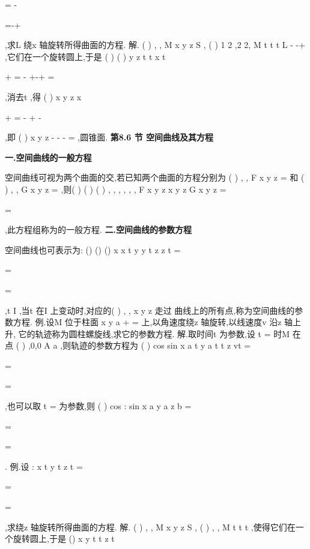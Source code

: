 =
-

=-+

,求L 绕x 轴旋转所得曲面的方程. 
解.
(
)
, ,
M x y z
S
\forall 
\in 
,
(
)
1 2 ,2
2,
M
t
t
t
L
\exists 
-
-+
\in 
,它们在一个旋转圆上,于是 
(
)
(
)
y
z
t
t
x
t

+
=
-
+-+
=

,消去t ,得
(
)
x
y
z
x


+
=
-
+
-




,即 
(
)
x
y
z
-
-
-
=
,圆锥面. 
\vspace{6pt}
{\large \bfseries \textcolor{lyred}{第8.6 节 空间曲线及其方程}}

\vspace{4pt}
{\bfseries \textcolor{lyred}{一.空间曲线的一般方程}}

空间曲线\Gamma 可视为两个曲面的交,若已知两个曲面的方程分别为
(
)
, ,
F x y z =
和 
(
)
, ,
G x y z =
,则(
)
(
)
(
)
, ,
, ,
, ,
F x y z
x y z
G x y z
=

\in \Gamma \Leftrightarrow 
=

,此方程组称为\Gamma 的\textcolor{lyred}{一般方程}. 
\vspace{4pt}
{\bfseries \textcolor{lyred}{二.空间曲线的参数方程}}

空间曲线也可表示为\Gamma :
()
()
()
x
x t
y
y t
z
z t
=


=


=

,t
I
\in 
,当t 在I 上变动时,对应的(
)
, ,
x y z 走过 
曲线上的所有点,称为空间曲线的\textcolor{lyred}{参数方程}. 
\textcolor{lyred}{例}.设M 位于柱面
x
y
a
+
=
上,以角速度\omega 绕z 轴旋转,以线速度v 沿z 轴上升, 
它的轨迹称为\textcolor{lyred}{圆柱螺旋线},求它的参数方程. 
解.取时间t 为参数,设
t =
时M 在点
(
)
,0,0
A a
,则轨迹的参数方程为 
(
)
cos
sin
x
a
t
y
a
t t
z
vt
\omega 
\omega 
=


=
\ge 

=

,也可以取
t
\theta 
\omega 
=
为参数,则
(
)
cos
:
sin
x
a
y
a
z
b
\theta 
\theta \theta 
\theta 
=


\Gamma 
=
\ge 

=

. 
\textcolor{lyred}{例}.设
:
x
t
y
t
z
t
=


\Gamma 
=

=

,求\Gamma 绕z 轴旋转所得曲面的方程. 
解.
(
)
, ,
M x y z
S
\forall 
\in 
,
(
)
,
,
M
t t
t
\exists 
\in \Gamma ,使得它们在一个旋转圆上,于是 
()
x
y
t
t
z
t

